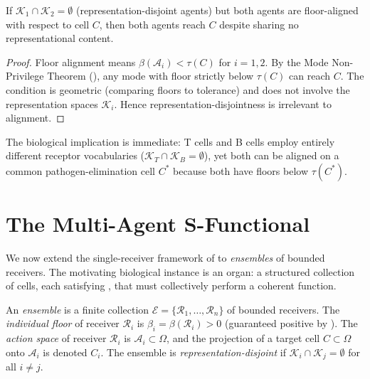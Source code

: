 \begin{proposition}
\label{prop:alignment-no-vocab}
If $\mathcal{K}_1 \cap \mathcal{K}_2 = \emptyset$ (representation-disjoint
agents) but both agents are floor-aligned with respect to cell $C$, then
both agents reach $C$ despite sharing no representational content.
\end{proposition}

\begin{proof}
Floor alignment means $\beta(\mathcal{A}_i) < \tau(C)$ for $i = 1, 2$.
By the Mode Non-Privilege Theorem (), any mode
with floor strictly below $\tau(C)$ can reach $C$.  The condition is
geometric (comparing floors to tolerance) and does not involve the
representation spaces $\mathcal{K}_i$.  Hence representation-disjointness is
irrelevant to alignment.
\end{proof}

The biological implication is immediate: T cells and B cells employ entirely
different receptor vocabularies ($\mathcal{K}_T \cap \mathcal{K}_B = \emptyset$),
yet both can be aligned on a common pathogen-elimination cell $C^*$ because
both have floors below $\tau(C^*)$.

\section{The Multi-Agent S-Functional}
\label{sec:multi-agent-s}

We now extend the single-receiver framework of  to
\emph{ensembles} of bounded receivers.  The motivating biological instance is
an organ: a structured collection of cells, each satisfying
, that must collectively perform
a coherent function.

\begin{definition}[Ensemble]
\label{def:ensemble}
An \emph{ensemble} is a finite collection
$\mathcal{E} = \{\mathcal{R}_1, \ldots, \mathcal{R}_n\}$ of bounded receivers.
The \emph{individual floor} of receiver $\mathcal{R}_i$ is
$\beta_i = \beta(\mathcal{R}_i) > 0$ (guaranteed positive by
).  The \emph{action space} of receiver
$\mathcal{R}_i$ is $\mathcal{A}_i \subset \Omega$, and the projection of a
target cell $C \subset \Omega$ onto $\mathcal{A}_i$ is denoted $C_i$.
The ensemble is \emph{representation-disjoint} if
$\mathcal{K}_i \cap \mathcal{K}_j = \emptyset$ for all $i \neq j$.
\end{definition}

